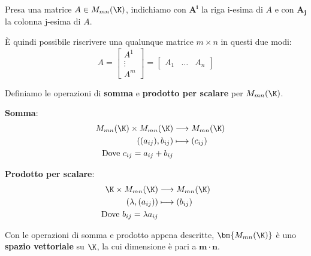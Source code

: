 \documentclass[11pt, a4paper, titlepage, oneside]{scrbook}
\begin{document}
\begin{Definizione}
\label{def-righ-col-matr}
Presa una matrice $A \in M_{mn}(\K)$, indichiamo con $\bm{A^i}$ la riga i-esima di $A$ e con $\bm{A_j}$ la colonna j-esima di $A$.
\end{Definizione}

È quindi possibile riscrivere una qualunque matrice $m \times n$ in questi due modi:
\[A = 
\begin{bmatrix}
A^1 \\
\vdots \\
A^m
\end{bmatrix}
=
\begin{bmatrix}
A_1 & \dots & A_n 
\end{bmatrix}
\]

Definiamo le operazioni di \textbf{somma} e \textbf{prodotto per scalare} per $M_{mn}(\K)$.

\bigskip

\begin{minipage}[c]{0.45\textwidth}
    \centering
    {\Large\textbf{Somma}:}
    \begin{align*}
        \hspace{0.4cm}M_{mn}(\K) \times M_{mn}(\K) &\longrightarrow M_{mn}(\K) \\
        \hspace{0.4cm}((a_{ij}),b_{ij}) &\longmapsto (c_{ij}) \\
        \hspace{0.4cm}\text{Dove } c_{ij} = a_{ij} + b_{ij}
    \end{align*}
\end{minipage}
\begin{minipage}[c]{0.45\textwidth}
    \centering
    {\Large\textbf{Prodotto per scalare}:}
    \begin{align*}
        \K \times M_{mn}(\K) &\longrightarrow M_{mn}(\K) \\
        (\lambda,(a_{ij})) &\longmapsto (b_{ij}) \\
        \text{Dove } b_{ij} = \lambda a_{ij}
    \end{align*}
\end{minipage}

\bigskip

\begin{Proposizione}[]
\label{propos-insieme-matrici-spazio-vettoriale}
Con le operazioni di somma e prodotto appena descritte, $\bm{M_{mn}(\K)}$ è uno \textbf{spazio vettoriale} su $\K$, la cui dimensione è pari a $\bm{m \cdot n}$.
\end{Proposizione}
\end{document}
